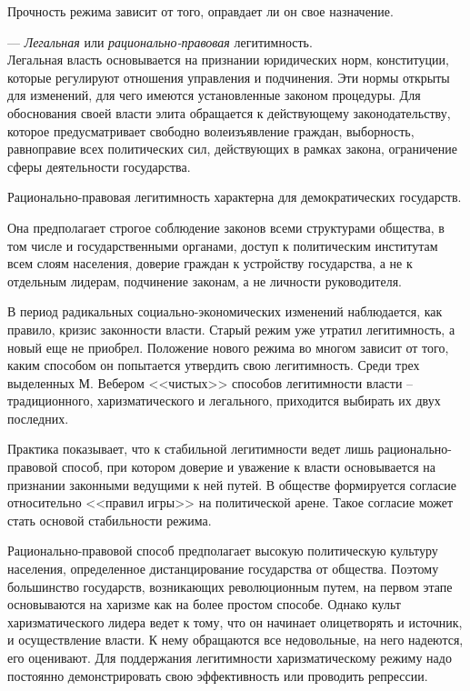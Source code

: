 Прочность режима зависит от того, оправдает ли он свое назначение.

\vspace*{1em}
--- \emph{Легальная} или \emph{рационально-правовая} легитимность.\\
Легальная власть основывается на признании юридических норм, конституции,
которые регулируют отношения управления и подчинения. Эти нормы открыты для
изменений, для чего имеются установленные законом процедуры. Для обоснования
своей власти элита обращается к действующему законодательству, которое
предусматривает свободно волеизъявление граждан, выборность, равноправие всех
политических сил, действующих в рамках закона, ограничение сферы деятельности
государства.

Рационально-правовая легитимность характерна для демократических государств.

Она предполагает строгое соблюдение законов всеми структурами общества, в том
числе и государственными органами, доступ к политическим институтам всем слоям
населения, доверие граждан к устройству государства, а не к отдельным лидерам,
подчинение законам, а не личности руководителя.

В период радикальных социально-экономических изменений наблюдается, как
правило, кризис законности власти. Старый режим уже утратил легитимность, а
новый еще не приобрел. Положение нового режима во многом зависит от того, каким
способом он попытается утвердить свою легитимность. Среди трех выделенных
М. Вебером <<чистых>> способов легитимности власти -- традиционного,
харизматического и легального, приходится выбирать их двух последних.

Практика показывает, что к стабильной легитимности ведет лишь
рационально-правовой способ, при котором доверие и уважение к власти
основывается на признании законными ведущими к ней путей. В обществе
формируется согласие относительно <<правил игры>> на политической арене. Такое
согласие может стать основой стабильности режима.

Рационально-правовой способ предполагает высокую политическую культуру
населения, определенное дистанцирование государства от общества. Поэтому
большинство государств, возникающих революционным путем, на первом этапе
основываются на харизме как на более простом способе. Однако культ
харизматического лидера ведет к тому, что он начинает олицетворять и источник,
и осуществление власти. К нему обращаются все недовольные, на него надеются,
его оценивают. Для поддержания легитимности харизматическому режиму надо
постоянно демонстрировать свою эффективность или проводить репрессии.

